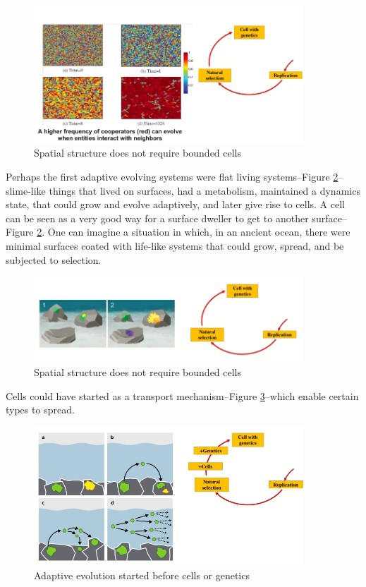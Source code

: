 \documentclass[]{article}
\begin{document}
\begin{figure}[H]
	\caption{Spatial structure does not require bounded cells}\label{fig:WangWang}
	\includegraphics[width=0.9\textwidth]{WangWang}
\end{figure}

Perhaps the first adaptive evolving systems were flat living systems--Figure \ref{fig:Baum2018}\cite{baum2018origin}--slime-like things that lived on surfaces, had a metabolism, maintained a dynamics state, that could grow and evolve adaptively, and later give rise to cells. A cell can be seen as a very good way for a surface dweller to get to another surface--Figure \ref{fig:Baum2018}. One can imagine a situation in which, in an ancient ocean, there were minimal surfaces coated with life-like systems that could grow, spread, and be subjected to selection.

\begin{figure}[H]
	\caption{Spatial structure does not require bounded cells}\label{fig:Baum2018}
	\includegraphics[width=0.9\textwidth]{Baum2018}
\end{figure}

Cells could have started as a transport mechanism--Figure \ref{fig:Baum2015}\cite{baum2015selection}--which enable certain types to spread.

\begin{figure}[H]
	\caption{Adaptive evolution started before cells or genetics}\label{fig:Baum2015}
	\includegraphics[width=0.9\textwidth]{Baum2015}
\end{figure}
\end{document}
